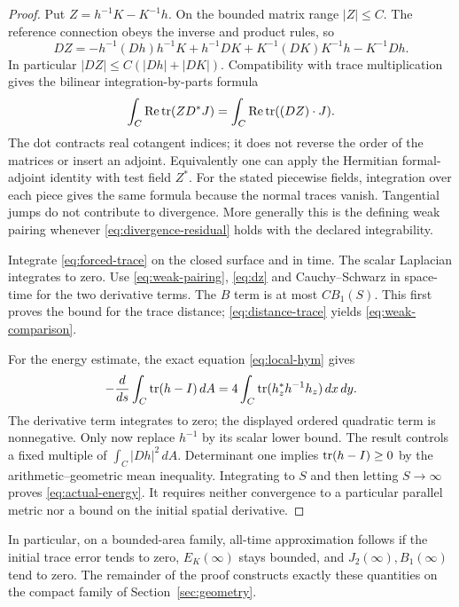 \begin{proof}
Put $Z=h^{-1}K-K^{-1}h$. On the bounded matrix range $|Z|\le C$.
The reference connection obeys the inverse and product rules, so
\begin{equation}\label{eq:dz}
 DZ=-h^{-1}(Dh)h^{-1}K+h^{-1}DK
           +K^{-1}(DK)K^{-1}h-K^{-1}Dh.
\end{equation}
In particular $|DZ|\le C(|Dh|+|DK|)$. Compatibility with trace
multiplication gives the bilinear integration-by-parts formula
\begin{equation}\label{eq:weak-pairing}
 \int_C\operatorname{Re}\operatorname{tr}(ZD^*J)
   =\int_C\operatorname{Re}\operatorname{tr}((DZ)\mathbin{\cdot}J).
\end{equation}
The dot contracts real cotangent indices; it does not reverse the
order of the matrices or insert an adjoint. Equivalently one can
apply the Hermitian formal-adjoint identity with test field $Z^*$.
For the stated piecewise fields, integration over each piece gives
the same formula because the normal traces vanish. Tangential jumps
do not contribute to divergence. More generally this is the defining
weak pairing whenever \eqref{eq:divergence-residual} holds with the
declared integrability.

Integrate \eqref{eq:forced-trace} on the closed surface and in
time. The scalar Laplacian integrates to zero. Use
\eqref{eq:weak-pairing}, \eqref{eq:dz} and Cauchy--Schwarz in
space-time for the two derivative terms. The $B$ term is at most
$CB_1(S)$. This first proves the bound for the trace distance;
\eqref{eq:distance-trace} yields \eqref{eq:weak-comparison}.

For the energy estimate, the exact equation \eqref{eq:local-hym}
gives
\begin{equation}\label{eq:trace-dissipation}
 -\frac{d}{ds}\int_C\operatorname{tr}(h-I)\,dA
       =4\int_C\operatorname{tr}(h_z^*h^{-1}h_z)\,dx\,dy.
\end{equation}
The derivative term integrates to zero; the displayed ordered
quadratic term is nonnegative. Only now replace $h^{-1}$ by its
scalar lower bound. The result controls a fixed multiple of
$\int_C|Dh|^2\,dA$. Determinant one implies $\operatorname{tr}(h-I)\ge0$
by the arithmetic--geometric mean inequality. Integrating to $S$
and then letting $S\to\infty$ proves \eqref{eq:actual-energy}.
It requires neither convergence to a particular parallel metric
nor a bound on the initial spatial derivative.
\end{proof}

In particular, on a bounded-area family, all-time approximation
follows if the initial trace error tends to zero, $E_K(\infty)$
stays bounded, and $J_2(\infty),B_1(\infty)$ tend to zero.
The remainder of the proof constructs exactly these quantities on
the compact family of Section~\ref{sec:geometry}.
